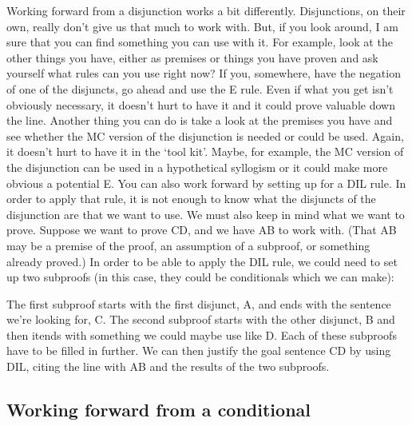 Working forward from a disjunction works a bit differently. Disjunctions, on their own, really don't give us that much to work with. But, if you look around, I am sure that you can find something you can use with it. For example, look at the other things you have, either as premises or things you have proven and ask yourself what rules can you use right now? If you, somewhere, have the negation of one of the disjuncts, go ahead and use the \eor E rule. Even if what you get isn't obviously necessary, it doesn't hurt to have it and it could prove valuable down the line. Another thing you can do is take a look at the premises you have and see whether the MC version of the disjunction is needed or could be used. Again, it doesn't hurt to have it in the `tool kit'. Maybe, for example, the MC version of the disjunction can be used in a hypothetical syllogism or it could make more obvious a potential \eif E. You can also work forward by setting up for a DIL rule. In order to apply that rule, it is not enough to know what the disjuncts of the disjunction are that we want to use. We must also keep in mind what we want to prove. Suppose we want to prove C\eor D, and we have A\eor B to work with. (That A\eor B may be a premise of the proof, an assumption of a subproof, or something already proved.) In order to be able to apply the DIL rule, we could need to set up two subproofs (in this case, they could be conditionals which we can make):

\begin{fitchproof}
\ellipsesline			
{}
\open
{}
\ellipsesline		
{}			
\close
{}	
\open
{}
\ellipsesline		
{}			
\close
{}	
 
\end{fitchproof}

The first subproof starts with the first disjunct, A, and ends with the sentence we’re looking for, C. The second subproof starts with the other disjunct, B and then itends with something we could maybe use like D. Each of these subproofs have to be filled in further. We can then justify the goal sentence C\eor D by using DIL, citing the line with A\eor B and the results of the two subproofs.

\subsection{Working forward from a conditional}

